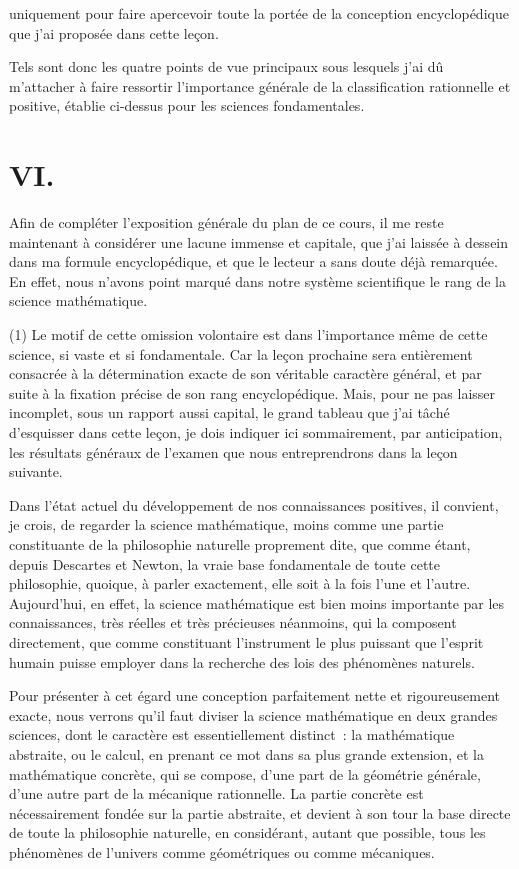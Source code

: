 \documentclass[french,twoside]{book} %
\begin{document}
uniquement pour faire apercevoir toute la portée de la conception encyclopédique que j’ai proposée dans cette leçon.\par
Tels sont donc les quatre points de vue principaux sous lesquels j’ai dû m’attacher à faire ressortir l’importance générale de la classification rationnelle et positive, établie ci-dessus pour les sciences fondamentales.
\section[{VI.}]{VI.}
\noindent Afin de compléter l’exposition générale du plan de ce cours, il me reste maintenant à considérer une lacune immense et capitale, que j’ai laissée à dessein dans ma formule encyclopédique, et que le lecteur a sans doute déjà remarquée. En effet, nous n’avons point marqué dans notre système scientifique le rang de la science mathématique.\par
(1) Le motif de cette omission volontaire est dans l’importance même de cette science, si vaste et si fondamentale. Car la leçon prochaine sera entièrement consacrée à la détermination exacte de son véritable caractère général, et par suite à la fixation précise de son rang encyclopédique. Mais, pour ne pas laisser incomplet, sous un rapport aussi capital, le grand tableau que j’ai tâché d’esquisser dans cette leçon, je dois indiquer ici sommairement, par anticipation, les résultats généraux de l’examen que nous entreprendrons dans la leçon suivante.\par
Dans l’état actuel du développement de nos connaissances positives, il convient, je crois, de regarder la science mathématique, moins comme une partie constituante de la philosophie naturelle proprement dite, que comme étant, depuis Descartes et Newton, la vraie base fondamentale de toute cette philosophie, quoique, à parler exactement, elle soit à la fois l’une et l’autre. Aujourd’hui, en effet, la science mathématique est bien moins importante par les connaissances, très réelles et très précieuses néanmoins, qui la composent directement, que comme constituant l’instrument le plus puissant que l’esprit humain puisse employer dans la recherche des lois des phénomènes naturels.\par
Pour présenter à cet égard une conception parfaitement nette et rigoureusement exacte, nous verrons qu’il faut diviser la science mathématique en deux grandes sciences, dont le caractère est essentiellement distinct : la mathématique abstraite, ou le calcul, en prenant ce mot dans sa plus grande extension, et la mathématique concrète, qui se compose, d’une part de la géométrie générale, d’une autre part de la mécanique rationnelle. La partie concrète est nécessairement fondée sur la partie abstraite, et devient à son tour la base directe de toute la philosophie naturelle, en considérant, autant que possible, tous les phénomènes de l’univers comme géométriques ou comme mécaniques.\par
\end{document}
